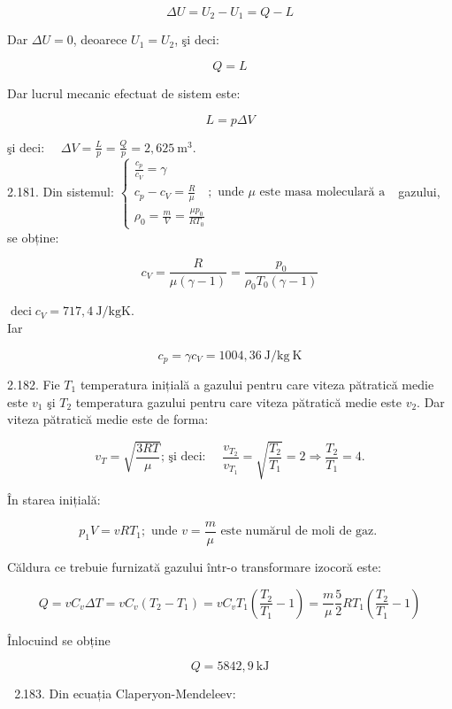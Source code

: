 $$
\Delta U=U_{2}-U_{1}=Q-L
$$

Dar $\Delta U=0$, deoarece $U_{1}=U_{2}$, şi deci:

$$
Q=L
$$

Dar lucrul mecanic efectuat de sistem este:

$$
L=p \Delta V
$$

şi deci: $\quad \Delta V=\frac{L}{p}=\frac{Q}{p}=2,625 \mathrm{~m}^{3}$.\\
2.181. Din sistemul: $\left\{\begin{array}{l}\frac{c_{p}}{c_{V}}=\gamma \\ c_{p}-c_{V}=\frac{R}{\mu} \quad ; \text { unde } \mu \text { este masa moleculară a } \\ \rho_{0}=\frac{m}{V}=\frac{\mu p_{0}}{R T_{0}}\end{array}\right.$ gazului, se obține:

$$
c_{V}=\frac{R}{\mu(\gamma-1)}=\frac{p_{0}}{\rho_{0} T_{0}(\gamma-1)}
$$

$\operatorname{deci} c_{V}=717,4 \mathrm{~J} / \mathrm{kg} \mathrm{K}$.\\
Iar

$$
c_{p}=\gamma c_{V}=1004,36 \mathrm{~J} / \mathrm{kg} \mathrm{~K}
$$

2.182. Fie $T_{1}$ temperatura inițială a gazului pentru care viteza pătratică medie este $v_{1}$ şi $T_{2}$ temperatura gazului pentru care viteza pătratică medie este $v_{2}$. Dar viteza pătratică medie este de forma:

$$
v_{T}=\sqrt{\frac{3 R T}{\mu}} \text {; şi deci: } \quad \frac{v_{T_{2}}}{v_{T_{1}}}=\sqrt{\frac{T_{2}}{T_{1}}}=2 \Rightarrow \frac{T_{2}}{T_{1}}=4 .
$$

În starea inițială:

$$
p_{1} V=v R T_{1} ; \text { unde } v=\frac{m}{\mu} \text { este numărul de moli de gaz. }
$$

Căldura ce trebuie furnizată gazului într-o transformare izocoră este:

$$
Q=v C_{v} \Delta T=v C_{v}\left(T_{2}-T_{1}\right)=v C_{v} T_{1}\left(\frac{T_{2}}{T_{1}}-1\right)=\frac{m}{\mu} \frac{5}{2} R T_{1}\left(\frac{T_{2}}{T_{1}}-1\right)
$$

Înlocuind se obține

$$
Q=5842,9 \mathrm{~kJ}
$$

\begin{enumerate}
  \setcounter{enumi}{1}
  \item 
  \begin{enumerate}
    \setcounter{enumii}{182}
    \item Din ecuația Claperyon-Mendeleev:
  \end{enumerate}
\end{enumerate}

